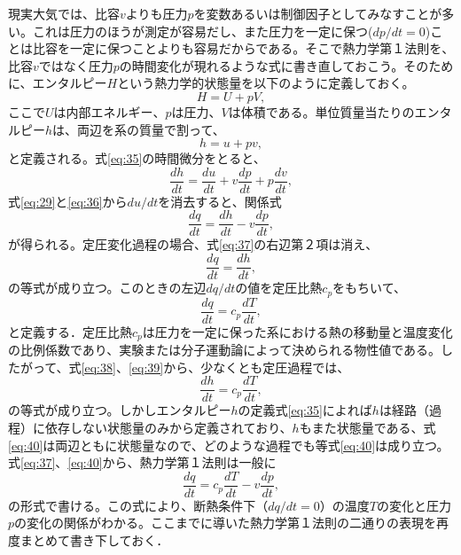\documentclass{ltjsarticle}
\begin{document}
現実大気では、比容$v$よりも圧力$p$を変数あるいは制御因子としてみなすことが多い。これは圧力のほうが測定が容易だし、また圧力を一定に保つ($dp/dt =0$)ことは比容を一定に保つことよりも容易だからである。そこで熱力学第１法則を、比容$v$ではなく圧力$p$の時間変化が現れるような式に書き直しておこう。そのために、エンタルピー$H$という熱力学的状態量を以下のように定義しておく。
\begin{equation}\label{eq:34}
 H=U+pV,
\end{equation}
ここで$U$は内部エネルギー、$p$は圧力、$V$は体積である。単位質量当たりのエンタルピー$h$は、両辺を系の質量で割って、
\begin{equation}\label{eq:35}
 h=u+pv,
\end{equation}
と定義される。式\eqref{eq:35}の時間微分をとると、
\begin{equation}\label{eq:36}
 \frac{dh}{dt}=\frac{du}{dt}+v\frac{dp}{dt}+p\frac{dv}{dt},
\end{equation}
式\eqref{eq:29}と\eqref{eq:36}から$du/dt$を消去すると、関係式
\begin{equation}\label{eq:37}
 \frac{dq}{dt}=\frac{dh}{dt}-v\frac{dp}{dt},
\end{equation}
が得られる。定圧変化過程の場合、式\eqref{eq:37}の右辺第２項は消え、
\begin{equation}\label{eq:38}
 \frac{dq}{dt}=\frac{dh}{dt},
\end{equation}
の等式が成り立つ。このときの左辺$dq/dt$の値を定圧比熱$c_{p}$をもちいて、
\begin{equation}\label{eq:39}
 \frac{dq}{dt}=c_{p}\frac{dT}{dt},
\end{equation}
と定義する．定圧比熱$c_{p}$は圧力を一定に保った系における熱の移動量と温度変化の比例係数であり、実験または分子運動論によって決められる物性値である。したがって、式\eqref{eq:38}、\eqref{eq:39}から、少なくとも定圧過程では、
\begin{equation}\label{eq:40}
 \frac{dh}{dt}=c_{p}\frac{dT}{dt},
\end{equation}
の等式が成り立つ。しかしエンタルピー$h$の定義式\eqref{eq:35}によれば$h$は経路（過程）に依存しない状態量のみから定義されており、$h$もまた状態量である、式\eqref{eq:40}は両辺ともに状態量なので、どのような過程でも等式\eqref{eq:40}は成り立つ。式\eqref{eq:37}、\eqref{eq:40}から、熱力学第１法則は一般に
\begin{equation}\label{eq:41}
 \frac{dq}{dt}=c_{p}\frac{dT}{dt}-v\frac{dp}{dt},
\end{equation}
の形式で書ける。この式により、断熱条件下（$dq/dt=0$）の温度$T$の変化と圧力$p$の変化の関係がわかる。ここまでに導いた熱力学第１法則の二通りの表現を再度まとめて書き下しておく．
\end{document}
